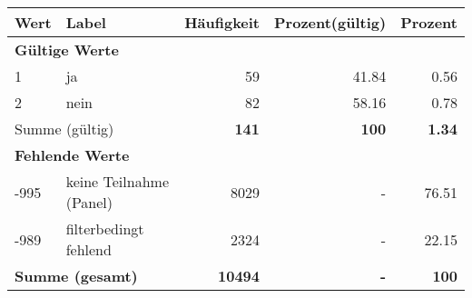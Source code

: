      \begin{longtable}{lXrrr}
     \toprule
     \textbf{Wert} & \textbf{Label} & \textbf{Häufigkeit} & \textbf{Prozent(gültig)} & \textbf{Prozent} \\
     \endhead
     \midrule
     \multicolumn{5}{l}{\textbf{Gültige Werte}}\\

     1 &
     \multicolumn{1}{X}{ ja   } &


       \num{59} &
       \num[round-mode=places,round-precision=2]{41,84} &
         \num[round-mode=places,round-precision=2]{0,56} \\

     2 &
     \multicolumn{1}{X}{ nein   } &


       \num{82} &
       \num[round-mode=places,round-precision=2]{58,16} &
         \num[round-mode=places,round-precision=2]{0,78} \\
     \midrule
     \multicolumn{2}{l}{Summe (gültig)} &
       \textbf{\num{141}} &
     \textbf{100} &
       \textbf{\num[round-mode=places,round-precision=2]{1,34}} \\
     \multicolumn{5}{l}{\textbf{Fehlende Werte}}\\
       -995 &
       keine Teilnahme (Panel) &
         \num{8029} &
        - &
         \num[round-mode=places,round-precision=2]{76,51} \\
       -989 &
       filterbedingt fehlend &
         \num{2324} &
        - &
         \num[round-mode=places,round-precision=2]{22,15} \\
     \midrule
     \multicolumn{2}{l}{\textbf{Summe (gesamt)}} &
          \textbf{\num{10494}} &
        \textbf{-} &
        \textbf{100} \\
     \bottomrule
     \end{longtable}
     
